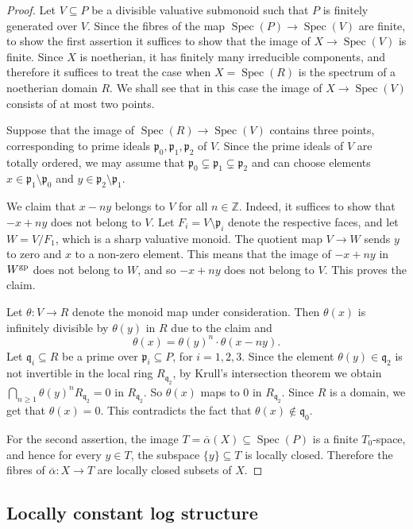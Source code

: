 \documentclass[a4paper,twoside,11pt,reqno]{amsart}
\renewcommand{\mathbb}{\mathds}
\newcommand{\bZ}{{\mathbb Z}}
\newcommand{\fp}{{\mathfrak p}}
\newcommand{\fq}{{\mathfrak q}}
\DeclareMathOperator{\Spec}{Spec}
\newcommand{\ov}[1]{\overline{#1}}
\theoremstyle{definition}
\numberwithin{equation}{subsection}
\begin{document}
\begin{proof}
Let $V\subseteq P$ be a divisible valuative submonoid such that $P$ is finitely generated over $V$. Since the fibres of the map $\Spec(P)\to \Spec(V)$ are finite, to show the first assertion it suffices to show that the image of $X\to\Spec(V)$ is finite. 
Since $X$ is noetherian, it has finitely many irreducible components, and therefore it suffices to treat the case when $X=\Spec(R)$ is the spectrum of a noetherian domain $R$. We shall see that in this case the image of $X\to \Spec(V)$ consists of at most two points. 

Suppose that the image of $\Spec(R)\to \Spec(V)$ contains three points, corresponding to prime ideals $\fp_0,\fp_1,\fp_2$ of $V$. Since the prime ideals of $V$ are totally ordered, we may assume that $\fp_0\subsetneq \fp_1\subsetneq \fp_2$ and can choose elements $x\in \fp_1\setminus \fp_0$ and $y\in \fp_2\setminus \fp_1$. 

We claim that $x - ny$ belongs to $V$ for all $n\in\bZ$. Indeed, it suffices to show that $-x + ny$ does not belong to $V$. Let $F_i = V\setminus\fp_i$ denote the respective faces, and let $W = V/F_1$, which is a sharp valuative monoid. The quotient map $V\to W$ sends $y$ to zero and $x$ to a non-zero element. This means that the image of $-x+ny$ in $W^{\rm gp}$ does not belong to $W$, and so $-x+ny$ does not belong to $V$. This proves the claim.

Let $\theta\colon V\to R$ denote the monoid map under consideration. Then $\theta(x)$ is infinitely divisible by $\theta(y)$ in $R$ due to  the claim and
\[
\theta(x) = \theta(y)^n \cdot \theta(x-ny).
\]
Let $\fq_i\subseteq R$  be a prime over $\fp_i\subseteq P$, for $i=1,2,3$. Since the element $\theta(y) \in \fq_2$ is not invertible in the local ring $R_{\fq_2}$, by Krull's intersection theorem we obtain $\bigcap_{n \geq 1} \theta(y)^nR_{\fq_2} = 0$ in $R_{\fq_2}$. 
So $\theta(x)$ maps to $0$ in $R_{\fq_2}$. Since $R$ is a domain, we get that $\theta(x) = 0$. This contradicts the fact that $\theta(x)\notin \fq_0$.

For the second assertion, the image $T = \ov\alpha(X)\subseteq \Spec(P)$ is a finite $T_0$-space, and hence for every $y\in T$, the subspace $\{y\}\subseteq T$ is locally closed. Therefore the fibres of $\ov\alpha\colon X\to T$ are locally closed subsets of $X$. 
\end{proof}

\subsection{Locally constant log structure}
\label{ss:loc-const}
\end{document}
